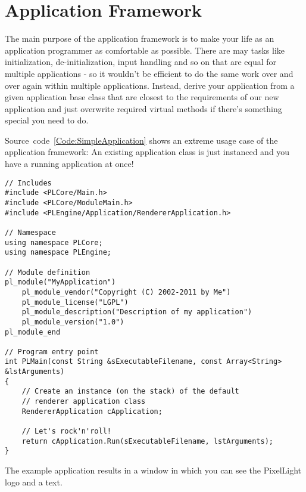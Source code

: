 \section{Application Framework}
The main purpose of the application framework is to make your life as an application programmer as comfortable as possible. There are may tasks like initialization, de-initialization, input handling and so on that are equal for multiple applications - so it wouldn't be efficient to do the same work over and over again within multiple applications. Instead, derive your application from a given application base class that are closest to the requirements of our new application and just overwrite required virtual methods if there's something special you need to do.

Source~code~\ref{Code:SimpleApplication} shows an extreme usage case of the application framework: An existing application class is just instanced and you have a running application at once!
\begin{lstlisting}[label=Code:SimpleApplication,caption={Simple application using the application framework}]
// Includes
#include <PLCore/Main.h>
#include <PLCore/ModuleMain.h>
#include <PLEngine/Application/RendererApplication.h>

// Namespace
using namespace PLCore;
using namespace PLEngine;

// Module definition
pl_module("MyApplication")
	pl_module_vendor("Copyright (C) 2002-2011 by Me")
	pl_module_license("LGPL")
	pl_module_description("Description of my application")
	pl_module_version("1.0")
pl_module_end

// Program entry point
int PLMain(const String &sExecutableFilename, const Array<String> &lstArguments)
{
	// Create an instance (on the stack) of the default
	// renderer application class
	RendererApplication cApplication;

	// Let's rock'n'roll!
	return cApplication.Run(sExecutableFilename, lstArguments);
}
\end{lstlisting}
The example application results in a window in which you can see the PixelLight logo and a text.
